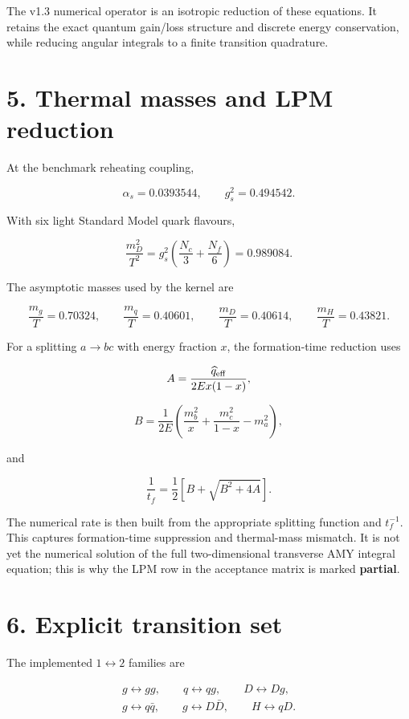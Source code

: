 \documentclass[
  10pt,
]{article}
\begin{document}
The v1.3 numerical operator is an isotropic reduction of these
equations. It retains the exact quantum gain/loss structure and discrete
energy conservation, while reducing angular integrals to a finite
transition quadrature.

\section{5. Thermal masses and LPM
reduction}\label{thermal-masses-and-lpm-reduction}

At the benchmark reheating coupling,

\[
\alpha_s=0.0393544,
\qquad
g_s^2=0.494542.
\]

With six light Standard Model quark flavours,

\[
\frac{m_D^2}{T^2}
=
g_s^2\left(\frac{N_c}{3}+\frac{N_f}{6}\right)
=0.989084.
\]

The asymptotic masses used by the kernel are

\[
\frac{m_g}{T}=0.70324,
\qquad
\frac{m_q}{T}=0.40601,
\qquad
\frac{m_D}{T}=0.40614,
\qquad
\frac{m_H}{T}=0.43821.
\]

For a splitting \(a\to bc\) with energy fraction \(x\), the
formation-time reduction uses

\[
A
=
\frac{\widehat q_{\rm eff}}
{2Ex(1-x)},
\]

\[
B
=
\frac{1}{2E}
\left(
\frac{m_b^2}{x}
+
\frac{m_c^2}{1-x}
-
m_a^2
\right),
\]

and

\[
\boxed{
\frac{1}{t_f}
=
\frac12
\left[
B+\sqrt{B^2+4A}
\right].
}
\]

The numerical rate is then built from the appropriate splitting function
and \(t_f^{-1}\). This captures formation-time suppression and
thermal-mass mismatch. It is not yet the numerical solution of the full
two-dimensional transverse AMY integral equation; this is why the LPM
row in the acceptance matrix is marked \textbf{partial}.

\section{6. Explicit transition set}\label{explicit-transition-set}

The implemented \(1\leftrightarrow2\) families are

\[
\begin{gathered}
g\leftrightarrow gg,
\qquad
q\leftrightarrow qg,
\qquad
D\leftrightarrow Dg,
\\
g\leftrightarrow q\bar q,
\qquad
g\leftrightarrow D\bar D,
\qquad
H\leftrightarrow qD.
\end{gathered}
\]
\end{document}
